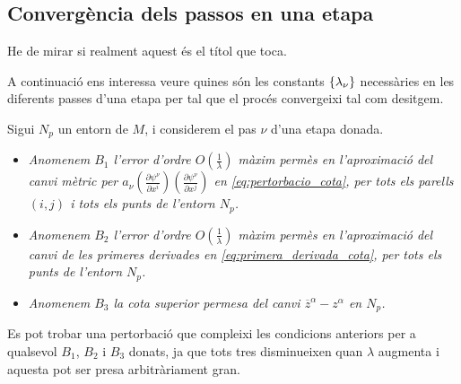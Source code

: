 \subsection{Convergència dels passos en una etapa}
{\color{blue} He de mirar si realment aquest és el títol que toca.}

A continuació ens interessa veure quines són les constants $\{\lambda_\nu\}$ necessàries en les diferents passes d'una etapa per tal que el procés convergeixi tal com desitgem.
\begin{defi}
    Sigui $N_p$ un entorn de $M$, i considerem el pas $\nu$ d'una etapa donada.
\end{defi}
\begin{itemize}\label{def: B1 B2 B3}
    \item \textit{Anomenem $B_1$ l'error d'ordre $O\left(\frac1{\lambda}\right)$ màxim permès en l'aproximació del canvi mètric per $a_\nu\left(\frac{\partial\psi^\nu}{\partial x^i}\right)\left(\frac{\partial\psi^\nu}{\partial x^j}\right)$ en \ref{eq:pertorbacio_cota}, per tots els parells $(i,j)$ i tots els punts de l'entorn $N_p$.}
    \item \textit{Anomenem $B_2$ l'error d'ordre $O\left(\frac1{\lambda}\right)$ màxim permès en l'aproximació del canvi de les primeres derivades en \ref{eq:primera_derivada_cota}, per tots els punts de l'entorn $N_p$.}
    \item \textit{Anomenem $B_3$ la cota superior permesa del canvi $\overline{z}^\alpha - z^\alpha$ en $N_p$.}
\end{itemize}
\begin{obs}
    Es pot trobar una pertorbació que compleixi les condicions anteriors per a qualsevol $B_1$, $B_2$ i $B_3$ donats, ja que tots tres disminueixen quan $\lambda$ augmenta i aquesta pot ser presa arbitràriament gran.
\end{obs}

